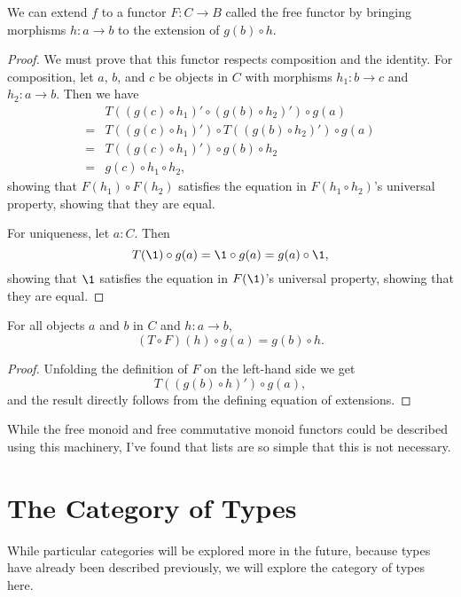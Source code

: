 \documentclass[../../math.tex]{subfiles}
\begin{document}
\begin{theorem}
    We can extend $f$ to a functor $F : C \to B$ called the free functor by
    bringing morphisms $h : a \to b$ to the extension of $g(b) \circ h$.
\end{theorem}
\begin{proof}
    We must prove that this functor respects composition and the identity.  For
    composition, let $a$, $b$, and $c$ be objects in $C$ with morphisms $h_1 : b
    \to c$ and $h_2 : a \to b$.  Then we have
    \begin{align*}
        &T((g(c) \circ h_1)' \circ (g(b) \circ h_2)') \circ g(a) \\
        ={}& T((g(c) \circ h_1)') \circ T((g(b) \circ h_2)') \circ g(a) \\
        ={}& T((g(c) \circ h_1)') \circ g(b) \circ h_2 \\
        ={}& g(c) \circ h_1 \circ h_2,
    \end{align*}
    showing that $F(h_1) \circ F(h_2)$ satisfies the equation in $F(h_1 \circ
    h_2)$'s universal property, showing that they are equal.

    For uniqueness, let $a : C$.  Then
    \[
        T(\1) \circ g(a) = \1 \circ g(a) = g(a) \circ \1,
    \]
    showing that $\1$ satisfies the equation in $F(\1)$'s universal property,
    showing that they are equal.
\end{proof}

\begin{theorem} \label{free_commute}
    For all objects $a$ and $b$ in $C$ and $h : a \to b$,
    \[
        (T \circ F)(h) \circ g(a) = g(b) \circ h.
    \]
\end{theorem}
\begin{proof}
    Unfolding the definition of $F$ on the left-hand side we get
    \[
        T((g(b) \circ h)') \circ g(a),
    \]
    and the result directly follows from the defining equation of extensions.
\end{proof}

While the free monoid and free commutative monoid functors could be described
using this machinery, I've found that lists are so simple that this is not
necessary.

\section{The Category of Types}

While particular categories will be explored more in the future, because types
have already been described previously, we will explore the category of types
here.
\end{document}
